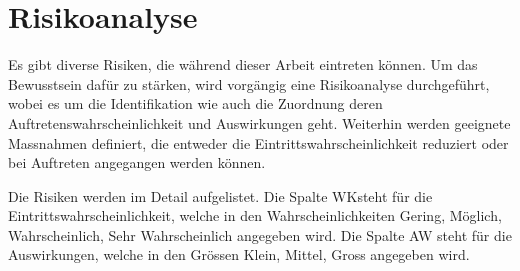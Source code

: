 \section{Risikoanalyse}
Es gibt diverse Risiken, die während dieser Arbeit eintreten können. Um das Bewusstsein dafür zu stärken,
wird vorgängig eine Risikoanalyse durchgeführt, wobei es um die Identifikation wie auch die Zuordnung deren
Auftretenswahrscheinlichkeit und Auswirkungen geht. Weiterhin werden geeignete Massnahmen definiert, die entweder
die Eintrittswahrscheinlichkeit reduziert oder bei Auftreten angegangen werden können.

Die Risiken werden im Detail aufgelistet. Die Spalte \glqq WK\grqq steht für die Eintrittswahrscheinlichkeit, welche
in den Wahrscheinlichkeiten \glqq Gering\grqq, \glqq Möglich\grqq, \glqq Wahrscheinlich\grqq, \glqq Sehr Wahrscheinlich\grqq{}
angegeben wird. Die Spalte \glqq AW\grqq{} steht für die Auswirkungen, welche in den Grössen \glqq Klein\grqq, \glqq Mittel\grqq, \glqq Gross\grqq{}
angegeben wird.

